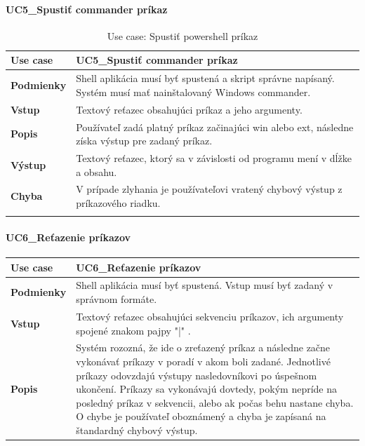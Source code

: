 {\begin{center}
\begin{longtable}{|p{2.5cm}|p{12.2cm}|}
	\end{longtable}
\end{center}

\paragraph{UC5\_Spustiť commander príkaz}
\begin{center}
	\begin{longtable}{|p{2.5cm}|p{12.2cm}|}

			\hline
			\textbf{Use case} & UC5\_Spustiť commander príkaz \\ 
			\hline
			\textbf{Podmienky} & Shell aplikácia musí byť spustená a skript správne napísaný. Systém musí mať nainštalovaný Windows commander.\\ 
			\hline
			\textbf{Vstup} & Textový reťazec obsahujúci príkaz a jeho argumenty.\\
			\hline
			\textbf{Popis} & Používateľ zadá platný príkaz začinajúci win alebo ext, následne získa výstup pre zadaný príkaz. \\ 
			\hline
			\textbf{Výstup} &Textový reťazec, ktorý sa v závislosti od programu mení v dĺžke a obsahu. \\
			\hline
			\textbf{Chyba} & V prípade zlyhania je používateľovi vratený chybový výstup z príkazového riadku.\\
			\hline
	\caption{Use case: Spustiť powershell príkaz}
	\label{table:1}

	\end{longtable}
\end{center}
\paragraph{UC6\_Reťazenie príkazov}
\begin{center}
	\begin{longtable}{|p{2.5cm}|p{12.2cm}|}

			\hline
			\textbf{Use case} & UC6\_Reťazenie príkazov \\ 
			\hline
			\textbf{Podmienky} & Shell aplikácia musí byť spustená. Vstup musí byť zadaný v správnom formáte.\\ 
			\hline
			\textbf{Vstup} & Textový reťazec obsahujúci sekvenciu príkazov, ich argumenty spojené znakom pajpy "|" .\\
			\hline
			\textbf{Popis} & Systém rozozná, že ide o zreťazený príkaz a následne začne vykonávať príkazy v poradí v akom boli zadané. Jednotlivé príkazy odovzdajú  výstupy nasledovníkovi po úspešnom ukončení. Príkazy sa vykonávajú dovtedy, pokým nepríde na posledný príkaz v sekvencii, alebo ak počas behu nastane chyba. O chybe je používateľ oboznámený a chyba je zapísaná na štandardný chybový výstup. \\ 
			\hline


\end{longtable}
\end{center}}
